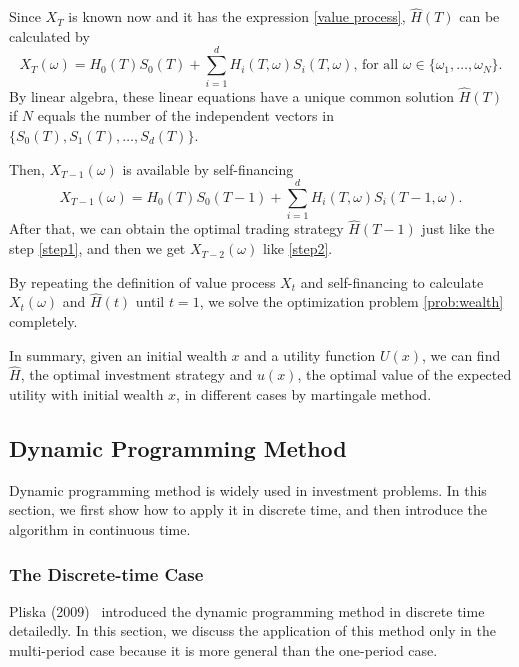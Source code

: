 \documentclass[a4paper]{article}
\theoremstyle{definition}
\numberwithin{equation}{section}
\begin{document}
Since $X_T$ is known now and it has the expression \eqref{value process}, $\hat H(T)$ can be calculated by
\begin{equation}\label{step1}
X_T(\omega)=H_0(T)S_0(T)+\sum^d_{i=1}H_i(T,\omega)S_i(T,\omega)\text{, for all }\omega\in\{\omega_1,\dots,\omega_N\}.
\end{equation}
By linear algebra, these linear equations have a unique common solution $\hat H(T)$ if $N$  equals the number of the independent vectors in $\{S_0(T),S_1(T),\dots,S_d(T)\}$.

Then, $X_{T-1}(\omega)$ is available by self-financing
\begin{equation}\label{step2}
X_{T-1}(\omega)=H_0(T)S_0(T-1)+\sum^d_{i=1}H_i(T,\omega)S_i(T-1,\omega).
\end{equation}
After that, we can obtain the optimal trading strategy $\hat H(T-1)$ just like the step \eqref{step1}, and then we get $X_{T-2}(\omega)$ like \eqref{step2}.

By repeating the definition of value process $X_t$ and self-financing to calculate $X_t(\omega)$ and $\hat H(t)$ until $t=1$, we solve the optimization problem \eqref{prob:wealth} completely.

In summary, given an initial wealth $x$ and a utility function $U(x)$, we can find $\hat H$, the optimal investment strategy and  $u(x)$, the optimal value of the expected utility with initial wealth $x$, in different cases by martingale method.

\subsection{Dynamic Programming Method}\label{sec:DPM}
Dynamic programming method is widely used in investment problems. In this section, we first show how to apply it in discrete time, and then introduce the algorithm in continuous time. 

\subsubsection{The Discrete-time Case}\label{sec:DPM_discrete}
Pliska (2009)~\cite{book2} introduced the dynamic programming method in discrete time detailedly. In this section, we discuss the application of this method only in the multi-period case because it is more general than the one-period case.
\end{document}
